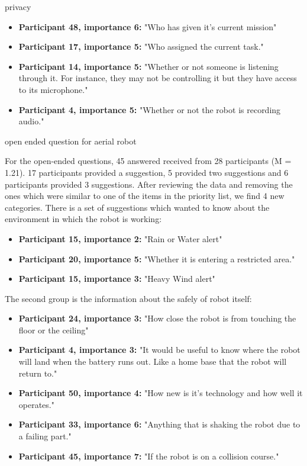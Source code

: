 \documentclass[letterpaper, 10 pt, conference]{ieeeconf}  %
\begin{document}
privacy
\begin{itemize}
    \item  \textbf{Participant 48, importance 6:} "Who has given it's current mission"
    \item  \textbf{Participant 17, importance 5:} "Who assigned the current task."
    \item  \textbf{Participant 14, importance 5:} "Whether or not someone is listening through it. For instance, they may not be controlling it but they have access to its microphone."
    \item  \textbf{Participant 4, importance 5:} "Whether or not the robot is recording audio."
\end{itemize}







open ended question for aerial robot

For the open-ended questions, 45 answered received from 28 participants (M = 1.21). 17 participants provided a suggestion, 5 provided two suggestions and 6 participants provided 3 suggestions. After reviewing the data and removing the ones which were similar to one of the items in the priority list, we find 4 new categories. There is a set of suggestions which wanted to know about the environment in which the robot is working: 

\begin{itemize}
    \item  \textbf{Participant 15, importance 2:} "Rain or Water alert"
    \item  \textbf{Participant 20, importance 5:} "Whether it is entering a restricted area."
    \item  \textbf{Participant 15, importance 3:} "Heavy Wind alert"
\end{itemize}

The second group is the information about the safely of robot itself:
\begin{itemize}
    \item  \textbf{Participant 24, importance 3:} "How close the robot is from touching the floor or the ceiling"
    \item  \textbf{Participant 4, importance 3:} "It would be useful to know where the robot will land when the battery runs out. Like a home base that the robot will return to."
    \item  \textbf{Participant 50, importance 4:} "How new is it's technology and how well it operates."
    \item  \textbf{Participant 33, importance 6:} "Anything that is shaking the robot due to a failing part."
    \item  \textbf{Participant 45, importance 7:} "If the robot is on a collision course."
\end{itemize}
\end{document}
